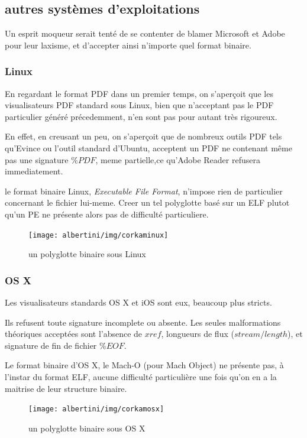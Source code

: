 \subsection{autres systèmes d'exploitations}

Un esprit moqueur serait tenté de se contenter de blamer Microsoft et Adobe pour leur laxisme, et d'accepter ainsi n'importe quel format binaire.

\subsubsection{Linux}

En regardant le format PDF dans un premier temps, on s'aperçoit que les visualisateurs PDF standard sous Linux, bien que n'acceptant pas le PDF particulier généré précedemment, n'en sont pas pour autant très rigoureux.

En effet, en creusant un peu, on s'aperçoit que de nombreux outils PDF tels qu'Evince ou l'outil standard d'Ubuntu, acceptent un PDF ne contenant même pas une signature $\%PDF$, meme partielle,ce qu'Adobe Reader refusera immediatement.

le format binaire Linux, {\it Executable File Format}, n'impose rien de particulier concernant le fichier lui-meme. Creer un tel polyglotte basé sur un ELF plutot qu'un PE ne présente alors pas de difficulté particuliere.

\begin{figure}[ht]
  \centering
  \texttt{[image: albertini/img/corkaminux]}
  \caption{un polyglotte binaire sous Linux}
  \label{fig:albertini:corkaminux}
\end{figure}

\subsubsection{OS X}

Les visualisateurs standards OS X et iOS sont eux, beaucoup plus stricts.

Ils refusent toute signature incomplete ou absente. Les seules malformations théoriques acceptées sont l'absence de $xref$, longueurs de flux ($stream /length$), et signature de fin de fichier $\%EOF$.

Le format binaire d'OS X, le Mach-O (pour Mach Object) ne présente pas, à l'instar du format ELF, aucune difficulté particulière une fois qu'on en a la maitrise de leur structure binaire.
\begin{figure}[ht]
  \centering
  \texttt{[image: albertini/img/corkamosx]}
  \caption{un polyglotte binaire sous OS X}
  \label{fig:albertini:corkamosx}
\end{figure}


